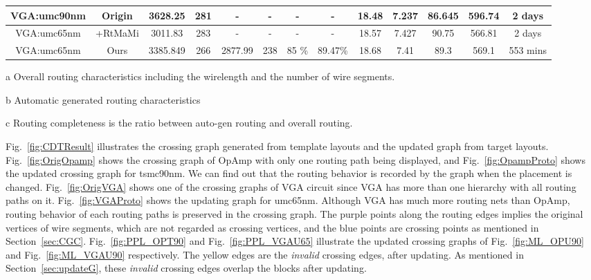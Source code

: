 \begin{table}
\begin{threeparttable}
\begin{center}
\begin{tabular}{|c|c|c|c|c|c|c|c|c|c|c|c|c|}
          VGA:umc90nm & Origin &  3628.25  &  281& -&-&- & - & 18.48 & 7.237&86.645 & 596.74 & 2 days \\
          \hline
          VGA:umc65nm & \cite{msc-bhattacharya-tcad06}+RtMaMi &  3011.83& 283 & -& - &- & - & 18.57 & 7.427 &90.75& 566.81&   2 days \\
          \hline
          VGA:umc65nm & Ours & 3385.849& 266 &  2877.99& 238 & 85 \% & 89.47\%&18.68 & 7.41& 89.3 & 569.1& 553 mins  \\
          \hline
        \end{tabular}
        \begin{tablenotes}
          \item [a] Overall routing characteristics including the wirelength and the number of wire segments. 
          \item [b] Automatic generated routing characteristics
          \item [c] Routing completeness is the ratio between auto-gen routing and overall routing. 
        \end{tablenotes}
        \end{center}
        \end{threeparttable}
      \end{table} 
         

      Fig.~\ref{fig:CDTResult} illustrates the crossing graph generated from template layouts and the updated graph from target layouts. Fig.~\ref{fig:OrigOpamp} shows the crossing graph of OpAmp with only one routing path being displayed, and Fig.~\ref{fig:OpampProto} shows the updated crossing graph for tsmc90nm. We can find out that the routing behavior is recorded by the graph when the placement is changed. Fig.~\ref{fig:OrigVGA} shows one of the crossing graphs of VGA circuit since VGA has more than one hierarchy with all routing paths on it. Fig.~\ref{fig:VGAProto} shows the updating graph for umc65nm. Although VGA has much more routing nets than OpAmp, routing behavior of each routing paths is preserved in the crossing graph. The purple points along the routing edges implies the original vertices of wire segments, which are not regarded as crossing vertices, and the blue points are crossing points as mentioned in Section~\ref{sec:CGC}. Fig.~\ref{fig:PPL_OPT90} and Fig.~\ref{fig:PPL_VGAU65} illustrate the updated crossing graphs of Fig.~\ref{fig:ML_OPU90} and Fig.~\ref{fig:ML_VGAU90} respectively. The yellow edges are the {\it invalid} crossing edges, after updating. As mentioned in Section~\ref{sec:updateG}, these {\it invalid} crossing edges overlap the blocks after updating.

